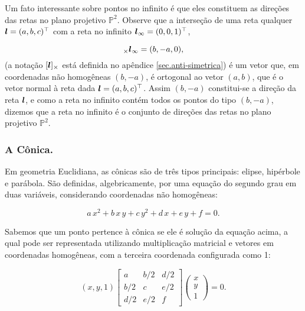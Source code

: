 Um fato interessante sobre pontos no infinito é que eles constituem as direções das retas no plano projetivo $\mathbb{P}^2$. Observe que a interseção de uma reta qualquer $\boldsymbol{l}=(a,b,c)^\top$ com a reta no infinito $\boldsymbol{l}_\infty=(0,0,1)^\top$,

\begin{equation*}
[\lightrgb]_\times \lightrgb_\infty=(b,-a,0),
\end{equation*}
(a notação $[\boldsymbol{l}]_\times$ está definida no apêndice \ref{sec.anti-simetrica}) é um vetor que, em coordenadas não homogêneas $(b,-a)$, é ortogonal ao vetor $(a,b)$, que é o vetor normal à reta dada $\boldsymbol{l}=(a,b,c)^\top$. Assim $(b,-a)$ constitui-se a direção da reta $\boldsymbol{l}$, e como a reta no infinito contém todos os pontos do tipo $(b,-a)$, dizemos que a reta no infinito é o conjunto de direções das retas no plano projetivo $\mathbb{P}^2$.\\





\subsubsection{A Cônica.}\label{sec.definicao-conica}


Em geometria Euclidiana, as cônicas são de três tipos principais: elipse, hipérbole e parábola. São definidas, algebricamente, por uma equação do segundo grau em duas variáveis, considerando coordenadas não homogêneas:

\begin{equation*}
a\,x^2+b\,x\,y+c\,y^2+d\,x+e\,y+f=0.
\end{equation*}

Sabemos que um ponto pertence à cônica se ele é solução da equação acima, a qual pode ser representada utilizando multiplicação matricial e vetores em coordenadas homogêneas, com a terceira coordenada configurada como 1:

\begin{equation*}
(x,y,1) 
 \begin{bmatrix}
a & b/2 & d/2\\
b/2 & c & e/2\\
d/2 & e/2 & f
\end{bmatrix}
 \begin{pmatrix}
x\\
y\\
1
\end{pmatrix}
 = 0.
\end{equation*}

